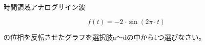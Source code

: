 時間領域アナログサイン波

\[
f(t) = -2 \cdot \sin ( 2\pi\cdot t )
\]

\bigskip
\noindent  の位相を反転させたグラフを選択肢a〜dの中から1つ選びなさい。
